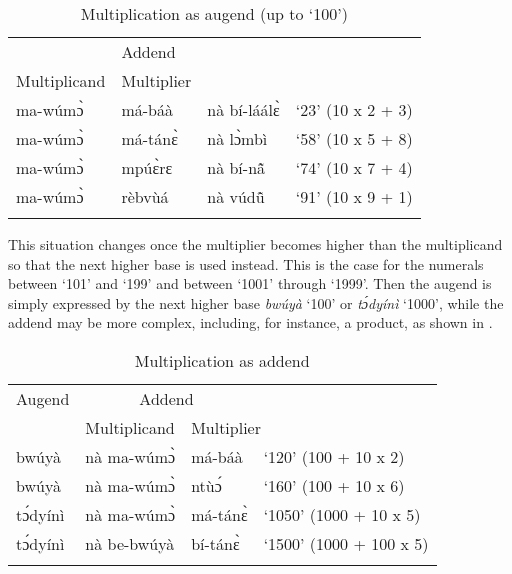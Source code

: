 \begin{table}
\begin{tabular}{lll l}
 \lsptoprule
\multicolumn{2}{c}{Augend} & Addend & \\\cmidrule(lr){1-2}
{Multiplicand} & {Multiplier} &  \\\midrule
ma-wúmɔ̀ & má-báà &   nà bí-láálɛ̀ & `23' (10 x 2 + 3)\\
ma-wúmɔ̀ & má-tánɛ̀  &   nà lɔ̀mbì & `58' (10 x 5 + 8) \\
ma-wúmɔ̀ & mpúɛ̀rɛ &   nà bí-nã̂ & `74' (10 x 7 + 4) \\
ma-wúmɔ̀ & rèbvùá &  nà vúdũ̂ & `91' (10 x 9 + 1) \\
  \lspbottomrule
\end{tabular}
\caption{Multiplication as augend (up to `100')}
\label{tab:NumOrder1}
\end{table}

\noindent This situation changes once the multiplier becomes higher than the multiplicand so that the next higher base is used instead. This is the case for the numerals between `101' and `199' and between `1001' through `1999'. Then the augend is simply expressed by the next higher base {\itshape bwúyà} `100' or {\itshape tɔ́dyínì} `1000', while the addend may be more complex, including, for instance, a product, as shown in .

\begin{table}
\begin{tabular}{lll l}
 \lsptoprule
{Augend} & \multicolumn{2}{c}{Addend} & \\\cmidrule(lr){2-3}
 & {Multiplicand} & \multicolumn{2}{l}{Multiplier}  \\\midrule
bwúyà  & nà  ma-wúmɔ̀ &  má-báà & `120' (100 + 10 x 2) \\
bwúyà  & nà ma-wúmɔ̀   &  ntùɔ́ & `160' (100 + 10 x 6) \\
tɔ́dyínì  & nà ma-wúmɔ̀ & má-tánɛ̀  & `1050' (1000 + 10 x 5) \\
tɔ́dyínì  & nà be-bwúyà & bí-tánɛ̀ & `1500' (1000 + 100 x 5) \\
  \lspbottomrule
\end{tabular}
\caption{Multiplication as addend}
\label{tab:NumOrder2}
\end{table}

